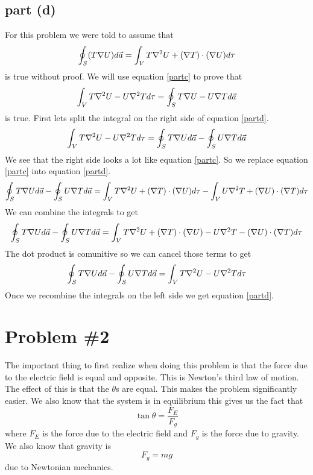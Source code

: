 \documentclass[11pt]{article}
\numberwithin{equation}{section}
\newcommand{\grad}{\bold\nabla}
\begin{document}
\subsection{part (d)}
For this problem we were told to assume that
\begin{equation}
\oint_S (T \grad U) d\vec{a} = \int_V T\grad^2U + (\grad T) \cdot (\grad U) d\tau
\label{partc}
\end{equation}
is true without proof. We will use equation \ref{partc} to prove that
\begin{equation}
\int_V T\grad^2U - U\grad^2T d\tau = \oint_S T\grad U - U\grad T d\vec{a}
\label{partd}
\end{equation}
is true.
First lets split the integral on the right side of equation \ref{partd}.
$$\int_V T\grad^2U - U\grad^2T d\tau = \oint_S T\grad U d\vec{a} -\oint_S U\grad T d\vec{a}$$
We see that the right side looks a lot like equation \ref{partc}. So we replace equation \ref{partc} into equation \ref{partd}.
$$\oint_S T\grad U d\vec{a} -\oint_S U\grad T d\vec{a} = \int_V T\grad^2U + (\grad T) \cdot (\grad U) d\tau - \int_V U\grad^2T + (\grad U) \cdot (\grad T) d\tau$$
We can combine the integrals to get
$$\oint_S T\grad U d\vec{a} -\oint_S U\grad T d\vec{a} = \int_V T\grad^2U + (\grad T) \cdot (\grad U) -  U\grad^2T - (\grad U) \cdot (\grad T) d\tau$$
The dot product is comunitive so we can cancel those terms to get
$$\oint_S T\grad U d\vec{a} -\oint_S U\grad T d\vec{a} = \int_V T\grad^2U -  U\grad^2T d\tau$$
Once we recombine the integrals on the left side we get equation \ref{partd}.
\begin{center}
\fbox{$\oint_S T\grad U - U\grad T d\vec{a} = \int_V T\grad^2U -  U\grad^2T d\tau$}
\end{center}
\section{Problem \#2}
The important thing to first realize when doing this problem is that the force due to the electric field is equal and opposite. This is Newton's third law of motion. The effect of this is that the $\theta$s are equal. This makes the problem significantly easier. We also know that the system is in equilibrium this gives us the fact that
\begin{equation}
\tan{\theta} = \frac{F_E}{F_g} 
\label{tan} 
\end{equation} 
where $F_E$ is the force due to the electric field and $F_g$ is the force due to gravity. We also know that gravity is
\begin{equation}
F_g = mg 
\label{grav} 
\end{equation} 
due to Newtonian mechanics.
\end{document}
